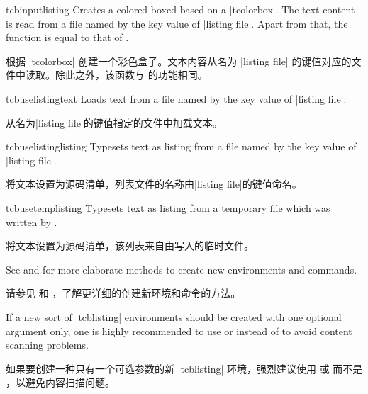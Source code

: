 
\begin{docCommand}{tcbinputlisting}{}
Creates a colored boxed based on a |tcolorbox|. The text content is read
from a file named by the key value of |listing file|. Apart from that,
the function is equal to that of .

根据 |tcolorbox| 创建一个彩色盒子。文本内容从名为 |listing file| 的键值对应的文件中读取。除此之外，该函数与  的功能相同。
\begin{dispExample}
\end{dispExample}
\end{docCommand}

\begin{docCommand}{tcbuselistingtext}{}
Loads text from a file named by the key value of |listing file|.

从名为|listing file|的键值指定的文件中加载文本。
\begin{dispExample}
\tcbuselistingtext
\end{dispExample}
\end{docCommand}


\begin{docCommand}{tcbuselistinglisting}{}
Typesets text as listing from a file named by the key value of |listing file|.

将文本设置为源码清单，列表文件的名称由|listing file|的键值命名。
\begin{dispExample}
\tcbuselistinglisting
\end{dispExample}
\end{docCommand}

\begin{docCommand}{tcbusetemplisting}{}
Typesets text as listing from a temporary file which was written by .

将文本设置为源码清单，该列表来自由写入的临时文件。
\end{docCommand}


\begin{marker}
See  and  for more
elaborate methods to create new environments and commands.

请参见  和 ，了解更详细的创建新环境和命令的方法。
\end{marker}
\begin{marker}
If a new sort of |tcblisting| environments should be created with
one optional argument only, one is highly recommended to use
 or 
instead of  to
avoid content scanning problems.

如果要创建一种只有一个可选参数的新 |tcblisting| 环境，强烈建议使用  或  而不是 ，以避免内容扫描问题。
\end{marker}